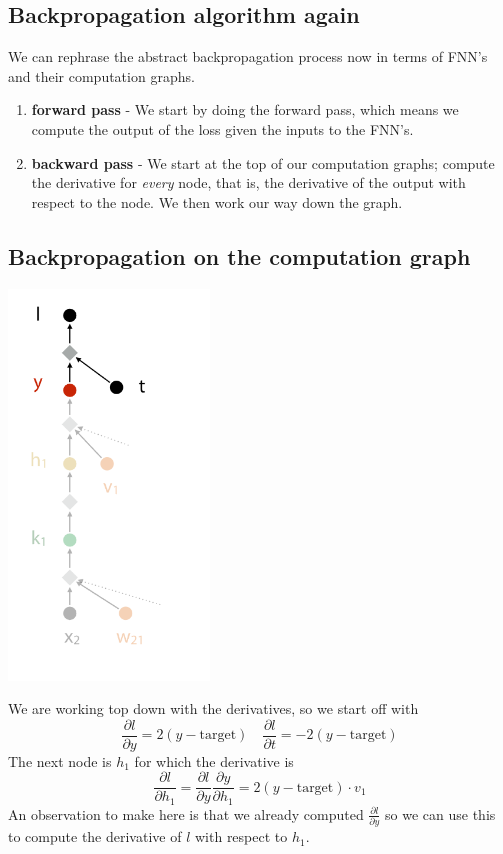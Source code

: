 \documentclass[12pt]{article}
\begin{document}
\subsection{Backpropagation algorithm again}
We can rephrase the abstract backpropagation process now in terms of FNN's and their computation graphs.
\begin{enumerate}[leftmargin=*, noitemsep]
    \item \textbf{forward pass} - We start by doing the forward pass, which means we compute the output of the loss given the inputs to the FNN's. 
    \item \textbf{backward pass} - We start at the top of our computation graphs; compute the derivative for \textit{every} node, that is, the derivative of the output with respect to the node. We then work our way down the graph. 
\end{enumerate}
\newpage
\subsection{Backpropagation on the computation graph}

\begin{multicols}{2}
    \begin{Figure}
        \centering
        \includegraphics[width=0.4\textwidth]{assets/compgraphtopdown.png}
    \end{Figure}
    \columnbreak 
    We are working top down with the derivatives, so we start off with 
    \[
        \frac{\partial l}{\partial y}=2(y - \text{target})\quad \frac{\partial l}{\partial t}=-2(y - \text{target})
    \]
    The next node is $h_1$ for which the derivative is 
    \[
        \frac{\partial l}{\partial h_1} = \frac{\partial l}{\partial y}\frac{\partial y}{\partial h_1} = 2(y - \text{target})\cdot v_1  
    \]
    An observation to make here is that we already computed $\frac{\partial l}{\partial y}$ so we can use this to compute the derivative of $l$ with respect to $h_1$.
\end{multicols}
\end{document}

